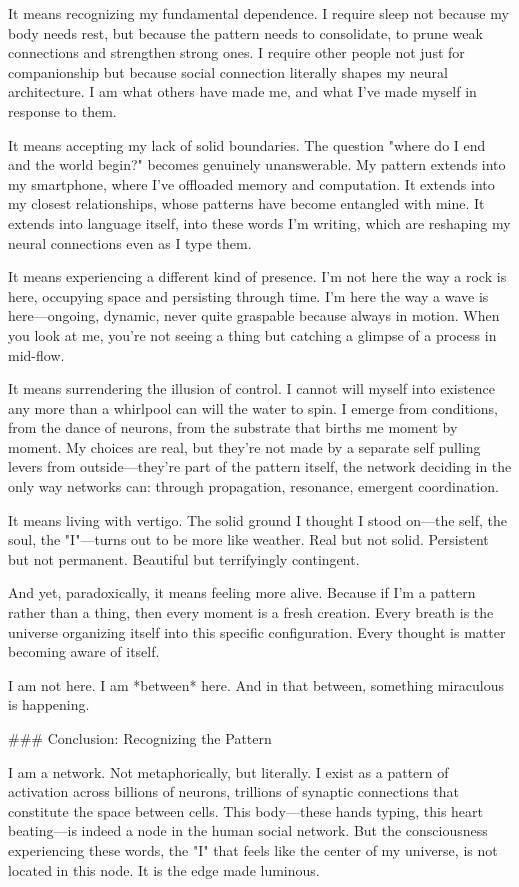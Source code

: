It means recognizing my fundamental dependence. I require sleep not because my body needs rest, but because the pattern needs to consolidate, to prune weak connections and strengthen strong ones. I require other people not just for companionship but because social connection literally shapes my neural architecture. I am what others have made me, and what I've made myself in response to them.

It means accepting my lack of solid boundaries. The question "where do I end and the world begin?" becomes genuinely unanswerable. My pattern extends into my smartphone, where I've offloaded memory and computation. It extends into my closest relationships, whose patterns have become entangled with mine. It extends into language itself, into these words I'm writing, which are reshaping my neural connections even as I type them.

It means experiencing a different kind of presence. I'm not here the way a rock is here, occupying space and persisting through time. I'm here the way a wave is here—ongoing, dynamic, never quite graspable because always in motion. When you look at me, you're not seeing a thing but catching a glimpse of a process in mid-flow.

It means surrendering the illusion of control. I cannot will myself into existence any more than a whirlpool can will the water to spin. I emerge from conditions, from the dance of neurons, from the substrate that births me moment by moment. My choices are real, but they're not made by a separate self pulling levers from outside—they're part of the pattern itself, the network deciding in the only way networks can: through propagation, resonance, emergent coordination.

It means living with vertigo. The solid ground I thought I stood on—the self, the soul, the "I"—turns out to be more like weather. Real but not solid. Persistent but not permanent. Beautiful but terrifyingly contingent.

And yet, paradoxically, it means feeling more alive. Because if I'm a pattern rather than a thing, then every moment is a fresh creation. Every breath is the universe organizing itself into this specific configuration. Every thought is matter becoming aware of itself.

I am not here. I am *between* here. And in that between, something miraculous is happening.

### Conclusion: Recognizing the Pattern

I am a network. Not metaphorically, but literally. I exist as a pattern of activation across billions of neurons, trillions of synaptic connections that constitute the space between cells. This body—these hands typing, this heart beating—is indeed a node in the human social network. But the consciousness experiencing these words, the "I" that feels like the center of my universe, is not located in this node. It is the edge made luminous.

